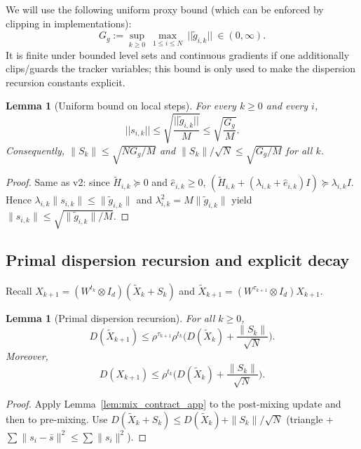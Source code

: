 \documentclass[11pt,a4paper]{article}
\def\norm#1{||#1||}%
\newtheorem{lemma}[theorem]{Lemma}
\newcommand{\norm}[1]{\left\|#1\right\|}
\begin{document}
We will use the following uniform proxy bound (which can be enforced by clipping in implementations):
\begin{equation}\label{eq:Gg_def_app}
	G_g:=\sup_{k\ge 0}\ \max_{1\le i\le N}\ \norm{\tilde g_{i,k}}\ \in(0,\infty).
\end{equation}
It is finite under bounded level sets and continuous gradients if one additionally clips/guards the tracker variables;
this bound is only used to make the dispersion recursion constants explicit.

\begin{lemma}[Uniform bound on local steps]\label{lem:step_bound_app}
	For every $k\ge 0$ and every $i$,
	\begin{equation}\label{eq:step_unif_app}
		\norm{s_{i,k}}\le \sqrt{\frac{\norm{\tilde g_{i,k}}}{M}}\le \sqrt{\frac{G_g}{M}}.
	\end{equation}
	Consequently, $\|S_k\|\le \sqrt{NG_g/M}$ and $\|S_k\|/\sqrt N\le \sqrt{G_g/M}$ for all $k$.
\end{lemma}
\begin{proof}
	Same as v2: since $\tilde H_{i,k}\succeq0$ and $\hat e_{i,k}\ge 0$,
	$(\tilde H_{i,k}+(\lambda_{i,k}+\hat e_{i,k})I)\succeq \lambda_{i,k}I$.
	Hence $\lambda_{i,k}\|s_{i,k}\|\le \|\tilde g_{i,k}\|$ and $\lambda_{i,k}^2=M\|\tilde g_{i,k}\|$ yield
	$\|s_{i,k}\|\le \sqrt{\|\tilde g_{i,k}\|/M}$.
\end{proof}

\subsection{Primal dispersion recursion and explicit decay}

Recall $X_{k+1}=(W^{t_k}\otimes I_d)(\tilde X_k+S_k)$ and $\tilde X_{k+1}=(W^{\tau_{k+1}}\otimes I_d)X_{k+1}$.

\begin{lemma}[Primal dispersion recursion]\label{lem:DX_rec_strict}
	For all $k\ge 0$,
	\begin{equation}\label{eq:DX_rec_strict_app}
		D(\tilde X_{k+1})\le \rho^{\tau_{k+1}}\rho^{t_k}\Big(D(\tilde X_k)+\frac{\|S_k\|}{\sqrt N}\Big).
	\end{equation}
	Moreover,
	\begin{equation}\label{eq:DX_post_app}
		D(X_{k+1})\le \rho^{t_k}\Big(D(\tilde X_k)+\frac{\|S_k\|}{\sqrt N}\Big).
	\end{equation}
\end{lemma}
\begin{proof}
	Apply Lemma~\ref{lem:mix_contract_app} to the post-mixing update and then to pre-mixing.
	Use $D(\tilde X_k+S_k)\le D(\tilde X_k)+\|S_k\|/\sqrt N$ (triangle + $\sum\|s_i-\bar s\|^2\le\sum\|s_i\|^2$).
\end{proof}
\end{document}
